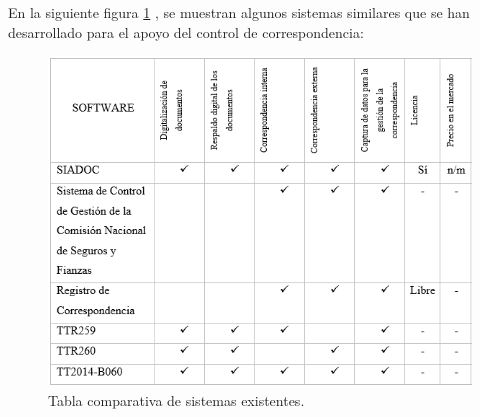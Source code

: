 
En la siguiente figura \ref{fig:Sistemas existentes} , se muestran algunos sistemas similares que se han desarrollado para el apoyo del control de correspondencia:\\

	\begin{figure}[htbp!]
		\centering
			\includegraphics[width=.8\textwidth]{images/antecedentes/ComparativaEA}
		\caption{Tabla comparativa de sistemas existentes.}
		\label{fig:Sistemas existentes}
	\end{figure}
	
